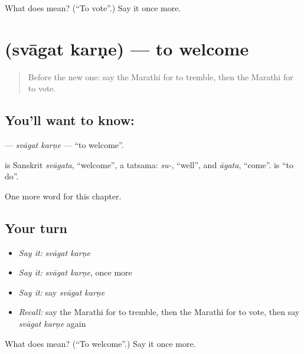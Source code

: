 \begin{tcolorbox}[breakable,colback=teal!4,colframe=teal!35!black,title={Before you move on}]
What does   mean? (\textquotedblleft{}To vote\textquotedblright{}.) Say it once more.
\end{tcolorbox}
\section[\texorpdfstring{\mr{स्वागत} \mr{करणे} (svāgat karṇe)}{स्वागत करणे (svāgat karṇe)}]{  (svāgat karṇe) — to welcome}

\label{lesson:MR-C198-svagat-karne}



\begin{quote}
Before the new one: say the Marathi for to tremble, then the Marathi for to vote.
\end{quote}

\subsection*{You'll want to know:  }
\textbf{ } — \emph{svāgat karṇe} — \textquotedblleft{}to welcome\textquotedblright{}.

\begin{cousinweb}
\textbf{} is Sanskrit \emph{svāgata}, \textquotedblleft{}welcome\textquotedblright{}, a tatsama: \emph{su-}, \textquotedblleft{}well\textquotedblright{}, and \emph{āgata}, \textquotedblleft{}come\textquotedblright{}. \textbf{} is \textquotedblleft{}to do\textquotedblright{}.
\end{cousinweb}

\begin{grammarlens}[title={What you've built}]
One more word for this chapter.
\end{grammarlens}

\subsection*{Your turn}
\begin{itemize}
\raggedright
  \item \emph{Say it:} \emph{svāgat karṇe}
  \item \emph{Say it:} \emph{svāgat karṇe}, once more
  \item \emph{Say it:} say \emph{svāgat karṇe}
  \item \emph{Recall:} say the Marathi for to tremble, then the Marathi for to vote, then say \emph{svāgat karṇe} again
\end{itemize}

\begin{tcolorbox}[breakable,colback=teal!4,colframe=teal!35!black,title={Before you move on}]
What does   mean? (\textquotedblleft{}To welcome\textquotedblright{}.) Say it once more.
\end{tcolorbox}
